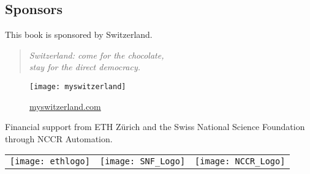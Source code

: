
\vfill
\subsection{Sponsors}

This book is sponsored by Switzerland.

\begin{quote}\centering
    \itshape
    Switzerland: come for the chocolate,\\
    stay for the direct democracy.
\end{quote}

\begin{figure}[h]
    \centering
    \texttt{[image: myswitzerland]}

    \href{http://myswitzerland.com}{myswitzerland.com}
\end{figure}


Financial support from ETH Zürich and the Swiss National Science Foundation through NCCR Automation.

\begin{figure*}
    \begin{tabular}{ccc}
        \texttt{[image: ethlogo]} & \texttt{[image: SNF\_Logo]} & \texttt{[image: NCCR\_Logo]}
    \end{tabular}
\end{figure*}

\vfill